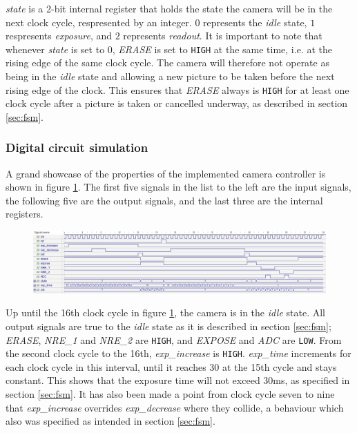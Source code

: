 \emph{state} is a 2-bit internal register that holds the state the camera will be in the next clock cycle, respresented by an integer. $0$ represents the \emph{idle} state, $1$ respresents \emph{exposure}, and $2$ represents \emph{readout}. It is important to note that whenever \emph{state} is set to $0$, \emph{ERASE} is set to \verb|HIGH| at the same time, i.e. at the rising edge of the same clock cycle. The camera will therefore not operate as being in the \emph{idle} state and allowing a new picture to be taken before the next rising edge of the clock. This ensures that \emph{ERASE} always is \verb|HIGH| for at least one clock cycle after a picture is taken or cancelled underway, as described in section \ref{sec:fsm}.

\subsubsection{Digital circuit simulation}

A grand showcase of the properties of the implemented camera controller is shown in figure \ref{fig:waveform}. The first five signals in the list to the left are the input signals, the following five are the output signals, and the last three are the internal registers.

\begin{figure}[H]
    \centering
    \includegraphics[width=\textwidth]{graphs/digital_waveform.png}
    \label{fig:waveform}
\end{figure}

Up until the 16th clock cycle in figure \ref{fig:waveform}, the camera is in the \emph{idle} state. All output signals are true to the \emph{idle} state as it is described in section \ref{sec:fsm}; \emph{ERASE}, \emph{NRE\_1} and \emph{NRE\_2} are \verb|HIGH|, and \emph{EXPOSE} and \emph{ADC} are \verb|LOW|. From the second clock cycle to the 16th, \emph{exp\_increase} is \verb|HIGH|. \emph{exp\_time} increments for each clock cycle in this interval, until it reaches $30$ at the 15th cycle and stays constant. This shows that the exposure time will not exceed $30$ms, as specified in section \ref{sec:fsm}. It has also been made a point from clock cycle seven to nine that \emph{exp\_increase} overrides \emph{exp\_decrease} where they collide, a behaviour which also was specified as intended in section \ref{sec:fsm}.

